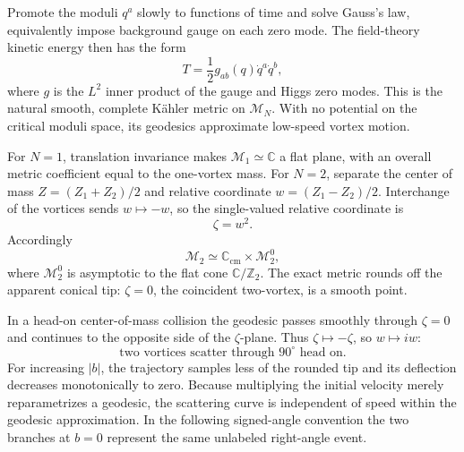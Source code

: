 \begin{enumerate}
  Promote the moduli \(q^a\) slowly to functions of time and solve Gauss's
  law, equivalently impose background gauge on each zero mode.  The
  field-theory kinetic energy then has the form
  \[
    T=\frac12g_{ab}(q)\dot q^a\dot q^b,
  \]
  where \(g\) is the \(L^2\) inner product of the gauge and Higgs zero
  modes.  This is the natural smooth, complete K\"ahler metric on
  \(\mathcal M_N\).  With no potential on the critical moduli space, its
  geodesics approximate low-speed vortex motion.

  For \(N=1\), translation invariance makes
  \(\mathcal M_1\simeq\mathbb C\) a flat plane, with an overall metric
  coefficient equal to the one-vortex mass.  For \(N=2\), separate the
  center of mass \(Z=(Z_1+Z_2)/2\) and relative coordinate
  \(w=(Z_1-Z_2)/2\).  Interchange of the vortices sends \(w\mapsto-w\),
  so the single-valued relative coordinate is
  \[
    \zeta=w^2.
  \]
  Accordingly
  \[
    \mathcal M_2\simeq\mathbb C_{\mathrm{cm}}
      \times\mathcal M_2^0,
  \]
  where \(\mathcal M_2^0\) is asymptotic to the flat cone
  \(\mathbb C/\mathbb Z_2\).  The exact metric rounds off the apparent
  conical tip: \(\zeta=0\), the coincident two-vortex, is a smooth point.

  In a head-on center-of-mass collision the geodesic passes smoothly
  through \(\zeta=0\) and continues to the opposite side of the
  \(\zeta\)-plane.  Thus \(\zeta\mapsto-\zeta\), so
  \(w\mapsto iw\):
  \[
    \boxed{\text{two vortices scatter through }90^\circ\text{ head on}.}
  \]
  For increasing \(|b|\), the trajectory samples less of the rounded
  tip and its deflection decreases monotonically to zero.  Because
  multiplying the initial velocity merely reparametrizes a geodesic, the
  scattering curve is independent of speed within the geodesic
  approximation.  In the following signed-angle convention the two
  branches at \(b=0\) represent the same unlabeled right-angle event.

  \begin{center}
  \end{center}


\end{enumerate}
